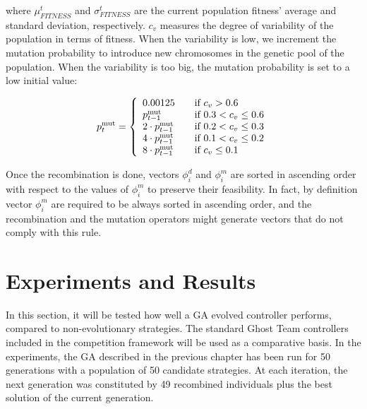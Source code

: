 \documentclass[a4paper]{llncs}
\begin{document}
where $\mu^t_{FITNESS}$ and $\sigma^t_{FITNESS}$ are the current population fitness' average and standard deviation, respectively. $c_v$ measures the degree of variability of the population in terms of fitness. When the variability is low, we increment the mutation probability to introduce new chromosomes in the genetic pool of the population. When the variability is too big, the mutation probability is set to a low initial value:
\begin{small}
\begin{equation}
 p^\mathrm{mut}_t = \left\{
\begin{array}{l l}
	0.00125 & \quad \textrm{if $c_v > 0.6$}\\
	p^\mathrm{mut}_{t-1} & \quad \textrm {if $0.3 < c_v \leq 0.6$}\\
	2 \cdot p^\mathrm{mut}_{t-1} & \quad \textrm {if $0.2 < c_v \leq 0.3$}\\
	4 \cdot p^\mathrm{mut}_{t-1} & \quad \textrm {if $0.1 < c_v \leq 0.2$}\\
	8 \cdot p^\mathrm{mut}_{t-1} & \quad \textrm {if $c_v \leq 0.1$}\\
   \end{array} \right.
\end{equation}
\end{small}
Once the recombination is done, vectors $\phi^d_i$ and $\phi^m_i $ are sorted in ascending order with respect to the values of $\phi^m_i $ to preserve their feasibility. In fact, by definition vector $\phi^m_i $ are required to be always sorted in ascending order, and the recombination and the mutation operators might generate vectors that do not comply with this rule.

%
%

\section{Experiments and Results}
\label{sec:experiments}

In this section, it will be tested how well a GA evolved controller performs, compared to non-evolutionary strategies. The standard Ghost Team controllers included in the competition framework will be used as a comparative basis.  
In the experiments, the GA described in the previous chapter has been
run for 50 generations with a population of 50 candidate 
strategies. At each iteration, the next generation was constituted by
49 recombined individuals plus the best solution of the current
generation. 
\end{document}
